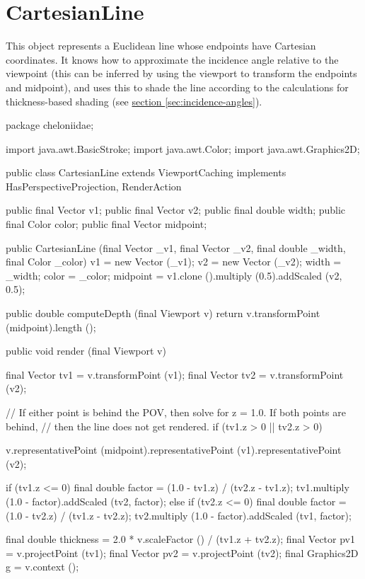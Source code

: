 \documentclass{report}
\newcommand{\Ref}[2]{\hyperref[#2]{#1 \ref*{#2}}}
\begin{document}
\section {CartesianLine} \label{sec:cartesianline}
      This object represents a Euclidean line whose endpoints have Cartesian coordinates. It knows how to approximate the incidence angle relative to the
      viewpoint (this can be inferred by using the viewport to transform the endpoints and midpoint), and uses this to shade the line according to the
      calculations for thickness-based shading (see \Ref{section}{sec:incidence-angles}).

\begin{javacode}
package cheloniidae;

import java.awt.BasicStroke;
import java.awt.Color;
import java.awt.Graphics2D;

public class CartesianLine extends ViewportCaching implements HasPerspectiveProjection, RenderAction {
  public final Vector v1;
  public final Vector v2;
  public final double width;
  public final Color  color;
  public final Vector midpoint;

  public CartesianLine (final Vector _v1, final Vector _v2, final double _width, final Color _color) {
    v1       = new Vector (_v1);
    v2       = new Vector (_v2);
    width    = _width;
    color    = _color;
    midpoint = v1.clone ().multiply (0.5).addScaled (v2, 0.5);
  }

  public double computeDepth (final Viewport v) {return v.transformPoint (midpoint).length ();}

  public void render (final Viewport v) {
    final Vector tv1 = v.transformPoint (v1);
    final Vector tv2 = v.transformPoint (v2);

    // If either point is behind the POV, then solve for z = 1.0. If both points are behind,
    // then the line does not get rendered.
    if (tv1.z > 0 || tv2.z > 0) {
      v.representativePoint (midpoint).representativePoint (v1).representativePoint (v2);

      if (tv1.z <= 0) {
        final double factor = (1.0 - tv1.z) / (tv2.z - tv1.z);
        tv1.multiply (1.0 - factor).addScaled (tv2, factor);
      } else if (tv2.z <= 0) {
        final double factor = (1.0 - tv2.z) / (tv1.z - tv2.z);
        tv2.multiply (1.0 - factor).addScaled (tv1, factor);
      }

      final double     thickness = 2.0 * v.scaleFactor () / (tv1.z + tv2.z);
      final Vector     pv1       = v.projectPoint (tv1);
      final Vector     pv2       = v.projectPoint (tv2);
      final Graphics2D g         = v.context ();

}}}
\end{javacode}
\end{document}
